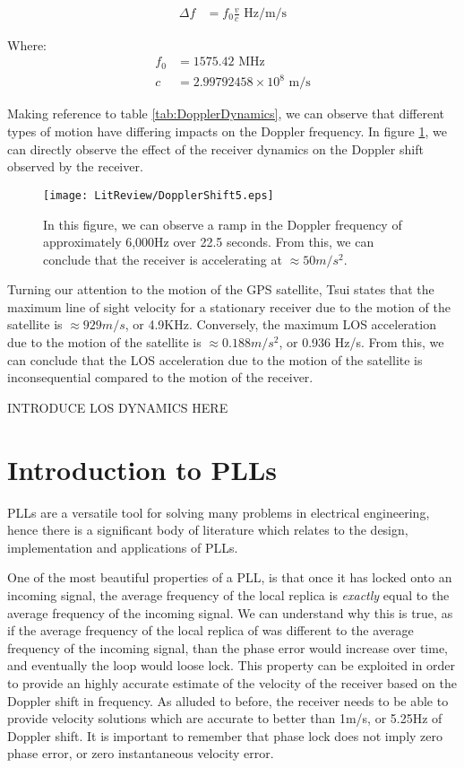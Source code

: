 \begin{align}
\Delta f &= f_0\frac{v}{c} \text{ Hz/m/s}
\label{eq:DopplerShift}
\end{align}

Where: 
\begin{align*}
f_0 &= 1575.42 \text{ MHz}\\   
c &= 2.99792458 \times 10^8 \text{ m/s}
\end{align*}


Making reference to table \ref{tab:DopplerDynamics}, we can observe that different types of motion have differing impacts on the Doppler frequency. In figure \ref{fig:DopplerShift}, we can directly observe the effect of the receiver dynamics on the Doppler shift observed by the receiver.

\begin{figure}[!htb] 
    \centering
    \texttt{[image: LitReview/DopplerShift5.eps]} 
    \caption{In this figure, we can observe a ramp in the Doppler frequency of approximately 6,000Hz over 22.5 seconds. From this, we can conclude that the receiver is accelerating at $\approx50 m/s^2$.}
    \label{fig:DopplerShift}
\end{figure}



Turning our attention to the motion of the GPS satellite, Tsui states that the maximum line of sight velocity for a stationary receiver due to the motion of the satellite is $\approx 929 m/s$, or 4.9KHz. Conversely, the maximum \ac{LOS} acceleration due to the motion of the satellite is $\approx 0.188m/s^2$, or 0.936 Hz/s\cite{Tsui}. From this, we can conclude that the LOS acceleration due to the motion of the satellite is inconsequential compared to the motion of the receiver. 

INTRODUCE LOS DYNAMICS HERE





\section{Introduction to PLLs}
PLLs are a versatile tool for solving many problems in electrical engineering, hence there is a significant body of literature which relates to the design, implementation and applications of PLLs. 

One of the most beautiful properties of a PLL, is that once it has locked onto an incoming signal, the average frequency of the local replica is \emph{exactly} equal to the average frequency of the incoming signal. We can understand why this is true, as if the average frequency of the local replica of was different to the average frequency of the incoming signal, than the phase error would increase over time, and eventually the loop would loose lock. This property can be exploited in order to provide an highly accurate estimate of the velocity of the receiver based on the Doppler shift in frequency. As alluded to before, the receiver needs to be able to provide velocity solutions which are accurate to better than 1m/s, or 5.25Hz of Doppler shift. It is important to remember that phase lock does not imply zero phase error, or zero instantaneous velocity error\cite{Gardner}. 

